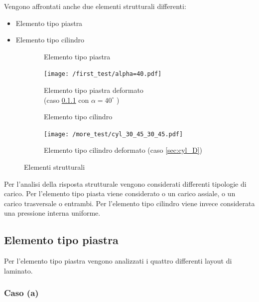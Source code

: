 \documentclass[a4paper,num-refs]{oup-contemporary}
\begin{document}
Vengono affrontati anche due elementi strutturali differenti:
\begin{itemize}
\item Elemento tipo piastra
\item Elemento tipo cilindro
\end{itemize}

\begin{figure}[bt!]
	\centering
	\begin{subfigure}[t]{0.24\textwidth}
		\centering
\def\svgwidth{\linewidth}

	 				\caption{Elemento tipo piastra}
		\label{fig:y equals x}
	\end{subfigure}
	\hfill
	\begin{subfigure}[t]{0.24\textwidth}
		\centering
		\texttt{[image: /first\_test/alpha=40.pdf]}
		\caption{Elemento tipo piastra deformato \\(caso \cref{sec:plate_A}  con $\alpha=40^\circ$ )}
		\label{fig:five over x}
	\end{subfigure}
	\hfill
	\begin{subfigure}[t]{0.24\textwidth}
		\centering
\def\svgwidth{\linewidth}

\caption{Elemento tipo cilindro}
		\label{fig:three sin x}
	\end{subfigure}
	\hfill
	\begin{subfigure}[t]{0.24\textwidth}
	\centering
 \texttt{[image: /more\_test/cyl\_30\_45\_30\_45.pdf]}
	\caption{Elemento tipo cilindro deformato (caso \cref{sec:cyl_D})}
	\label{fig:five ove x}
\end{subfigure}
	\hfill
	\caption{Elementi strutturali}
	\label{fig:three graphs}
\end{figure}

Per l'analisi della risposta strutturale vengono considerati differenti tipologie di carico. Per l'elemento tipo piasta viene considerato o un carico assiale, o un carico trasversale o entrambi. Per l'elemento tipo cilindro viene invece considerata una pressione interna uniforme.

\subsection{Elemento tipo piastra}

Per l'elemento tipo piastra vengono analizzati i quattro differenti layout di laminato.

\subsubsection{Caso (a)}
\label{sec:plate_A}
\end{document}
